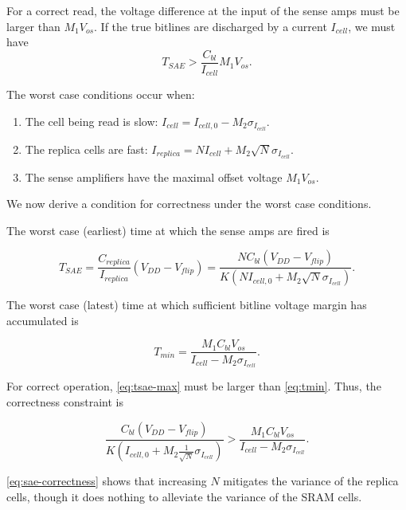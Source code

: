 For a correct read, the voltage difference at the input of the sense amps must be larger than $M_1 V_{os}.$
If the true bitlines are discharged by a current $I_{cell}$, we must have
\begin{equation}
T_{SAE} > \frac{C_{bl}}{I_{cell}} M_1 V_{os}.
\end{equation}

The worst case conditions occur when:
\begin{enumerate}
\item The cell being read is slow: $ I_{cell} = I_{cell,0} - M_2 \sigma_{I_{cell}}. $

\item The replica cells are fast: $ I_{replica} = N I_{cell} + M_2 \sqrt{N} \sigma_{I_{cell}}. $

\item The sense amplifiers have the maximal offset voltage $M_1 V_{os}$.
\end{enumerate}

We now derive a condition for correctness under the worst case conditions.

The worst case (earliest) time at which the sense amps are fired is

\begin{equation} \label{eq:tsae-max}
T_{SAE} = \frac{C_{replica}}{I_{replica}} \left( V_{DD} - V_{flip} \right)
= \frac{ N C_{bl}  \left(V_{DD} - V_{flip} \right) }{ K \left( N I_{cell,0} + M_2 \sqrt{N} \sigma_{I_{cell}} \right)}.
\end{equation}

The worst case (latest) time at which sufficient bitline voltage margin has accumulated is

\begin{equation} \label{eq:tmin}
T_{min} = \frac{M_1 C_{bl} V_{os}}{I_{cell} - M_2 \sigma_{I_{cell}}}.
\end{equation}

For correct operation, \ref{eq:tsae-max} must be larger than \ref{eq:tmin}. Thus, the correctness constraint is

\begin{equation} \label{eq:sae-correctness}
\frac{C_{bl}  \left( V_{DD} - V_{flip}\right)}{K \left( I_{cell,0} + M_2 \frac{1}{\sqrt{N}} \sigma_{I_{cell}} \right)} >
\frac{M_1 C_{bl} V_{os}}{I_{cell} - M_2 \sigma_{I_{cell}}}.
\end{equation}

\ref{eq:sae-correctness} shows that increasing $N$ mitigates the variance of the replica cells,
though it does nothing to alleviate the variance of the SRAM cells.

